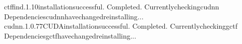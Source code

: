 \documentclass[a4paper,11pt,english]{sphinxmanual}
\begin{document}
\begin{sphinxVerbatim}[commandchars=\\\{\}]
ctffind.1.10installationsuccessful.
\PYGZhy{}\PYGZhy{}\PYGZhy{}\PYGZhy{}\PYGZhy{}\PYGZhy{}\PYGZhy{}\PYGZhy{}\PYGZhy{}\PYGZhy{}\PYGZhy{}\PYGZhy{}\PYGZhy{}\PYGZhy{}\PYGZhy{}\PYGZhy{}\PYGZhy{}\PYGZhy{}\PYGZhy{}\PYGZhy{}\PYGZhy{}\PYGZhy{}\PYGZhy{}\PYGZhy{}\PYGZhy{}\PYGZhy{}\PYGZhy{}\PYGZhy{}\PYGZhy{}\PYGZhy{}\PYGZhy{}\PYGZhy{}\PYGZhy{}\PYGZhy{}\PYGZhy{}\PYGZhy{}\PYGZhy{}\PYGZhy{}\PYGZhy{}\PYGZhy{}\PYGZhy{}\PYGZhy{}\PYGZhy{}\PYGZhy{}\PYGZhy{}\PYGZhy{}\PYGZhy{}\PYGZhy{}\PYGZhy{}\PYGZhy{}\PYGZhy{}\PYGZhy{}\PYGZhy{}\PYGZhy{}\PYGZhy{}\PYGZhy{}\PYGZhy{}\PYGZhy{}\PYGZhy{}\PYGZhy{}\PYGZhy{}\PYGZhy{}\PYGZhy{}\PYGZhy{}\PYGZhy{}\PYGZhy{}\PYGZhy{}\PYGZhy{}\PYGZhy{}\PYGZhy{}\PYGZhy{}\PYGZhy{}
Completed.
Currentlycheckingcudnn
Dependenciescudnnhavechanged\PYGZhy{}reinstalling...
\PYGZhy{}\PYGZhy{}\PYGZhy{}\PYGZhy{}\PYGZhy{}\PYGZhy{}\PYGZhy{}\PYGZhy{}\PYGZhy{}\PYGZhy{}\PYGZhy{}\PYGZhy{}\PYGZhy{}\PYGZhy{}\PYGZhy{}\PYGZhy{}\PYGZhy{}\PYGZhy{}\PYGZhy{}\PYGZhy{}\PYGZhy{}\PYGZhy{}\PYGZhy{}\PYGZhy{}\PYGZhy{}\PYGZhy{}\PYGZhy{}\PYGZhy{}\PYGZhy{}\PYGZhy{}\PYGZhy{}\PYGZhy{}\PYGZhy{}\PYGZhy{}\PYGZhy{}\PYGZhy{}\PYGZhy{}\PYGZhy{}\PYGZhy{}\PYGZhy{}\PYGZhy{}\PYGZhy{}\PYGZhy{}\PYGZhy{}\PYGZhy{}\PYGZhy{}\PYGZhy{}\PYGZhy{}\PYGZhy{}\PYGZhy{}\PYGZhy{}\PYGZhy{}\PYGZhy{}\PYGZhy{}\PYGZhy{}\PYGZhy{}\PYGZhy{}\PYGZhy{}\PYGZhy{}\PYGZhy{}\PYGZhy{}\PYGZhy{}\PYGZhy{}\PYGZhy{}\PYGZhy{}\PYGZhy{}\PYGZhy{}\PYGZhy{}\PYGZhy{}\PYGZhy{}\PYGZhy{}\PYGZhy{}
cudnn.1.0.77CUDAinstallationsuccessful.
\PYGZhy{}\PYGZhy{}\PYGZhy{}\PYGZhy{}\PYGZhy{}\PYGZhy{}\PYGZhy{}\PYGZhy{}\PYGZhy{}\PYGZhy{}\PYGZhy{}\PYGZhy{}\PYGZhy{}\PYGZhy{}\PYGZhy{}\PYGZhy{}\PYGZhy{}\PYGZhy{}\PYGZhy{}\PYGZhy{}\PYGZhy{}\PYGZhy{}\PYGZhy{}\PYGZhy{}\PYGZhy{}\PYGZhy{}\PYGZhy{}\PYGZhy{}\PYGZhy{}\PYGZhy{}\PYGZhy{}\PYGZhy{}\PYGZhy{}\PYGZhy{}\PYGZhy{}\PYGZhy{}\PYGZhy{}\PYGZhy{}\PYGZhy{}\PYGZhy{}\PYGZhy{}\PYGZhy{}\PYGZhy{}\PYGZhy{}\PYGZhy{}\PYGZhy{}\PYGZhy{}\PYGZhy{}\PYGZhy{}\PYGZhy{}\PYGZhy{}\PYGZhy{}\PYGZhy{}\PYGZhy{}\PYGZhy{}\PYGZhy{}\PYGZhy{}\PYGZhy{}\PYGZhy{}\PYGZhy{}\PYGZhy{}\PYGZhy{}\PYGZhy{}\PYGZhy{}\PYGZhy{}\PYGZhy{}\PYGZhy{}\PYGZhy{}\PYGZhy{}\PYGZhy{}\PYGZhy{}\PYGZhy{}
Completed.
Currentlycheckinggctf
Dependenciesgctfhavechanged\PYGZhy{}reinstalling...

\end{sphinxVerbatim}
\end{document}
